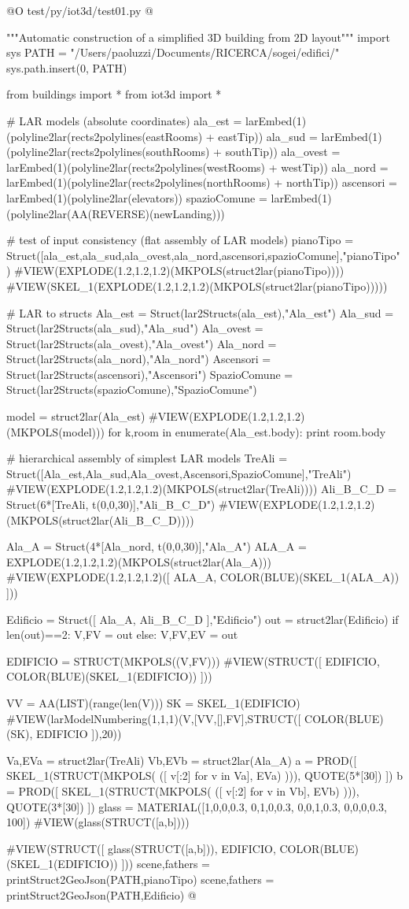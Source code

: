 \documentclass[11pt,oneside]{article}	%
\begin{document}
@O test/py/iot3d/test01.py
@{"""Automatic construction of a simplified 3D building from 2D layout"""
import sys
PATH = "/Users/paoluzzi/Documents/RICERCA/sogei/edifici/"
sys.path.insert(0, PATH)

from buildings import *
from iot3d import *

# LAR models (absolute coordinates)
ala_est = larEmbed(1)(polyline2lar(rects2polylines(eastRooms) + eastTip))
ala_sud = larEmbed(1)(polyline2lar(rects2polylines(southRooms) + southTip))
ala_ovest = larEmbed(1)(polyline2lar(rects2polylines(westRooms) + westTip))
ala_nord = larEmbed(1)(polyline2lar(rects2polylines(northRooms) + northTip)) 
ascensori = larEmbed(1)(polyline2lar(elevators))
spazioComune = larEmbed(1)(polyline2lar(AA(REVERSE)(newLanding)))

# test of input consistency (flat assembly of LAR models)
pianoTipo = Struct([ala_est,ala_sud,ala_ovest,ala_nord,ascensori,spazioComune],"pianoTipo")
#VIEW(EXPLODE(1.2,1.2,1.2)(MKPOLS(struct2lar(pianoTipo))))
#VIEW(SKEL_1(EXPLODE(1.2,1.2,1.2)(MKPOLS(struct2lar(pianoTipo)))))

# LAR to structs
Ala_est = Struct(lar2Structs(ala_est),"Ala_est")
Ala_sud = Struct(lar2Structs(ala_sud),"Ala_sud")
Ala_ovest = Struct(lar2Structs(ala_ovest),"Ala_ovest")
Ala_nord = Struct(lar2Structs(ala_nord),"Ala_nord")
Ascensori = Struct(lar2Structs(ascensori),"Ascensori")
SpazioComune = Struct(lar2Structs(spazioComune),"SpazioComune")

model = struct2lar(Ala_est)
#VIEW(EXPLODE(1.2,1.2,1.2)(MKPOLS(model)))
for k,room in enumerate(Ala_est.body):
    print room.body

# hierarchical assembly of simplest LAR models
TreAli = Struct([Ala_est,Ala_sud,Ala_ovest,Ascensori,SpazioComune],"TreAli")
#VIEW(EXPLODE(1.2,1.2,1.2)(MKPOLS(struct2lar(TreAli))))
Ali_B_C_D = Struct(6*[TreAli, t(0,0,30)],"Ali_B_C_D")
#VIEW(EXPLODE(1.2,1.2,1.2)(MKPOLS(struct2lar(Ali_B_C_D))))

Ala_A = Struct(4*[Ala_nord,  t(0,0,30)],"Ala_A")
ALA_A = EXPLODE(1.2,1.2,1.2)(MKPOLS(struct2lar(Ala_A)))
#VIEW(EXPLODE(1.2,1.2,1.2)([ ALA_A, COLOR(BLUE)(SKEL_1(ALA_A)) ]))

Edificio = Struct([ Ala_A, Ali_B_C_D ],"Edificio")
out = struct2lar(Edificio)
if len(out)==2: V,FV = out
else: V,FV,EV = out

EDIFICIO = STRUCT(MKPOLS((V,FV)))
#VIEW(STRUCT([ EDIFICIO, COLOR(BLUE)(SKEL_1(EDIFICIO)) ]))

VV = AA(LIST)(range(len(V)))
SK = SKEL_1(EDIFICIO)
#VIEW(larModelNumbering(1,1,1)(V,[VV,[],FV],STRUCT([ COLOR(BLUE)(SK), EDIFICIO ]),20))

Va,EVa = struct2lar(TreAli)
Vb,EVb = struct2lar(Ala_A)
a = PROD([ SKEL_1(STRUCT(MKPOLS( ([ v[:2] for v in Va], EVa) ))), QUOTE(5*[30]) ])
b = PROD([ SKEL_1(STRUCT(MKPOLS( ([ v[:2] for v in Vb], EVb) ))), QUOTE(3*[30]) ])
glass = MATERIAL([1,0,0,0.3,  0,1,0,0.3,  0,0,1,0.3, 0,0,0,0.3, 100])
#VIEW(glass(STRUCT([a,b])))

#VIEW(STRUCT([ glass(STRUCT([a,b])), EDIFICIO, COLOR(BLUE)(SKEL_1(EDIFICIO)) ]))
scene,fathers = printStruct2GeoJson(PATH,pianoTipo)
scene,fathers = printStruct2GeoJson(PATH,Edificio)
@}
\end{document}
